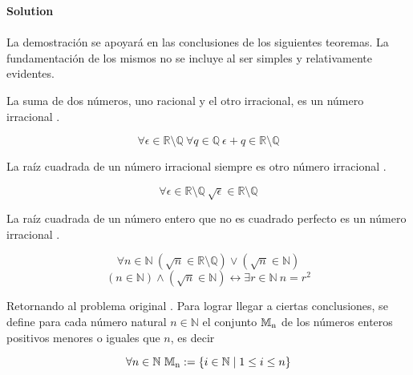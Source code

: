 \noindent\textbf{Solution } \\\\

La demostración se apoyará en las conclusiones de los siguientes teoremas. La fundamentación de los mismos no se incluye al ser simples y relativamente evidentes.

\begin{theorem} \label{irnum_sum_rational}
	La suma de dos números, uno racional y el otro irracional, es un número irracional .
	
	\begin{equation} \label{eq_irnum_sum_rational}
		\forall \epsilon \in \mathbb{R} \setminus \mathbb{Q}\ \forall q \in \mathbb{Q}\ \epsilon + q \in \mathbb{R} \setminus \mathbb{Q}
	\end{equation}
\end{theorem}

\begin{theorem} \label{irnum_closure_sqrt}
	La raíz cuadrada de un número irracional siempre es otro número irracional .
	
	\begin{equation} \label{eq_irnum_closure_sqrt}
		\forall \epsilon \in \mathbb{R} \setminus \mathbb{Q}\ \sqrt{\epsilon} \in \mathbb{R} \setminus \mathbb{Q}
	\end{equation}
\end{theorem}

\begin{theorem} \label{irnum_nat_sqrt}
	La raíz cuadrada de un número entero que no es cuadrado perfecto es un número irracional .
	
	\begin{equation} \label{eq_irnum_nat_sqrt}
		\forall n \in \mathbb{N}\ (\sqrt{n} \in \mathbb{R} \setminus \mathbb{Q}) \lor (\sqrt{n} \in \mathbb{N})
	\end{equation}
	\begin{equation}
		(n \in \mathbb{N}) \land (\sqrt{n} \in \mathbb{N}) \leftrightarrow \exists r \in \mathbb{N}\ n = r^{2}
	\end{equation}
\end{theorem}

Retornando al problema original . Para lograr llegar a ciertas conclusiones, se define para cada número natural $n \in \mathbb{N}$ el conjunto $\mathbb{M}\textsubscript{n}$ de los números enteros positivos menores o iguales que $n$, es decir 

\begin{equation} \label{eq_11_bmo200700003_1}
	\forall n \in \mathbb{N}\ \mathbb{M}\textsubscript{n} := \{i \in \mathbb{N} \mid 1 \leq i \leq n\}
\end{equation}

